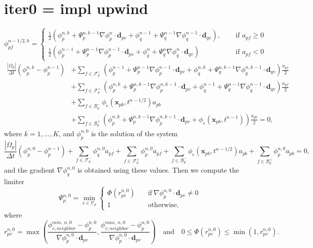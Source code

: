 \documentclass{article}
\begin{document}
\section{iter0 = impl upwind}
\[ \phi_{pf}^{n-1/2, k} =
\begin{cases}
	\frac{1}{2}(\phi_p^{n, k} + \Psi_p^{n, k-1}\nabla\phi_p^{n}\cdot\boldsymbol{d}_{pv}
	+
	\phi_q^{n-1} + \Psi_q^{n-1}\nabla\phi_q^{n-1}\cdot\boldsymbol{d}_{qv}), \quad &\text{ if } a_{pf} \geq 0 \\
	\frac{1}{2}(\phi_p^{n-1} + \Psi_p^{n-1}\nabla\phi_p^{n-1}\cdot\boldsymbol{d}_{pv}
	+
	\phi_q^{n} + \Psi_q^{n}\nabla\phi_q^{n}\cdot\boldsymbol{d}_{qv}) \quad &\text{ if } a_{pf} < 0
\end{cases} \]
\begin{align}
	\nonumber
	\frac{|\Omega_p|}{\Delta t}(\phi_p^{n,k} - \phi_p^{n-1}) 
	&+ \sum_{f \in \mathcal{F}_p^-}(\phi_p^{n-1} + \Psi_p^{n-1}\nabla\phi_p^{n-1}\cdot\boldsymbol{d}_{pv}
	+
	\phi_q^{n,k} + \Psi_q^{n,k-1}\nabla\phi_q^{n,k-1}\cdot\boldsymbol{d}_{qv}) \frac{a_{pf}}{2} \nonumber\\ 
	&+ \sum_{f \in \mathcal{F}_p^+} (\phi_p^{n,k} + \Psi_p^{n,k-1}\nabla\phi_p^{n,k-1}\cdot\boldsymbol{d}_{pv}
	+
	\phi_q^{n-1} + \Psi_q^{n-1}\nabla\phi_q^{n-1}\cdot\boldsymbol{d}_{qv})\frac{a_{pf}}{2}\nonumber\\ 
	&+ \sum_{f \in \mathcal{B}_p^-} \phi_e(\boldsymbol{x}_{pb}, t^{n-1/2}) a_{pb}\nonumber \\
	&+ \sum_{f \in \mathcal{B}_p^+} (\phi_p^{n,k} + \Psi_p^{n,k-1}\nabla\phi_p^{n,k-1}\cdot\boldsymbol{d}_{pv}
	+
	\phi_e(\boldsymbol{x}_{pb}, t^{n-1})) \frac{a_{pb}}{2} = 0,
\end{align}
where $ k = 1,\dots, K $, and $ \phi_p^{n, 0} $ is the solution of the system
\begin{equation}
	\frac{|\Omega_p|}{\Delta t}(\phi_p^{n,0} - \phi_p^{n-1}) 
	+ \sum_{f \in \mathcal{F}_p^-} \phi_q^{n,0} a_{pf}
	+ \sum_{f \in \mathcal{F}_p^+} \phi_p^{n,0} a_{pf} 
	+ \sum_{f \in \mathcal{B}_p^-} \phi_e(\boldsymbol{x}_{pb}, t^{n-1/2}) a_{pb}
	+ \sum_{f \in \mathcal{B}_p^+} \phi_p^{n,0}a_{pb} = 0,
\end{equation}
and the gradient $ \nabla\phi_q^{n,0} $ is obtained using these values. 
Then we compute the limiter 
\begin{equation}
	\Psi_p^{n,0} = \min_{v \in \mathcal{V}_p}
	\begin{cases}
		\Phi(r_{pv}^{n,0}) \quad &\text{if} \ \nabla\phi_p^{n,0}\cdot\boldsymbol{d}_{pv} \neq 0\\
		1 \quad &\text{otherwise},
	\end{cases}
\end{equation}
where
\[ r_{pv}^{n, 0} = \max 
\left(\frac{\phi_{v, neighbor}^{min,\,n, 0}
-\phi_p^{n, 0}}{\nabla\phi_p^{n, 0} \cdot \boldsymbol{d}_{pv}}, 
\frac{\phi_{v, neighbor}^{max,\,n, 0} 
-\phi_p^{n, 0}}{\nabla\phi_p^{n, 0} \cdot \boldsymbol{d}_{pv}}\right) 
\quad\text{and}\quad
0 \leq \Phi(r_{pv}^{n, 0}) \leq \min(1, r_{pv}^{n,0}). \]
\end{document}
